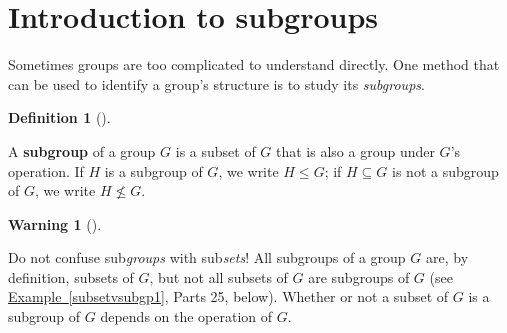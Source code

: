 \documentclass[10pt,]{book}
\newcommand{\terminology}[1]{\textbf{#1}}
\theoremstyle{plain}
\theoremstyle{definition}
\newtheorem{definition}[theorem]{Definition}
\theoremstyle{definition}
\newtheorem{warning}[theorem]{Warning}
\theoremstyle{definition}
\theoremstyle{definition}
\numberwithin{equation}{section}
\begin{document}
\section[{Introduction to subgroups}]{Introduction to subgroups}\label{section-13}

    Sometimes groups are too complicated to understand directly. One method that can be used to identify a group's structure is to study its \emph{subgroups}.
\begin{definition}[{}]\label{definition-34}

        A \terminology{subgroup} of a group \(G\) is a subset of \(G\) that
        is also a group under \(G\)'s operation. If \(H\) is a subgroup of
        \(G\), we write \(H \leq G\); if \(H\subseteq G\) is not a subgroup of
        \(G\), we write \(H\not\leq G\).
\label{notation-51}
\label{notation-52}
\end{definition}
\begin{warning}[]\label{warning-14}

      Do not confuse sub\emph{groups} with sub\emph{sets}!
      All subgroups of a group \(G\) are, by definition, subsets of
      \(G\), but not all subsets of \(G\) are subgroups of \(G\) (see
      \hyperref[subsetvsubgp1]{Example~\ref{subsetvsubgp1}}, Parts 2\textendash{}5, below). Whether or not
      a subset of \(G\) is a subgroup of \(G\) depends on the operation
      of \(G\).
\end{warning}
\end{document}
